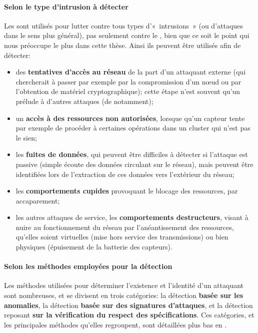         \paragraph{Selon le type d'intrusion à détecter}
Les \IDS sont utilisés pour lutter contre tous types d'« intrusions » (ou d'attaques dans le sens plus général), pas seulement contre le \dds, bien que ce soit le point qui nous préoccupe le plus dans cette thèse.
Ainsi ils peuvent être utilisés afin de détecter:
\begin{itemize}
    \item des \textbf{tentatives d'accès au réseau} de la part d'un attaquant externe (qui chercherait à passer par exemple par la compromission d'un nœud ou par l'obtention de matériel cryptographique); cette étape n'est souvent qu'un prélude à d'autres attaques (de \dds notamment);
    \item un \textbf{accès à des ressources non autorisées}, lorsque qu'un capteur tente par exemple de procéder à certaines opérations dans un cluster qui n'est pas le sien;
    \item les \textbf{fuites de données}, qui peuvent être difficiles à détecter si l'attaque est passive (simple écoute des données circulant sur le réseau), mais peuvent être identifiées lors de l'extraction de ces données vers l'extérieur du réseau;
    \item les \textbf{comportements cupides} provoquant le blocage des ressources, par accaparement;
    \item les autres attaques de service, \cad les \textbf{comportements destructeurs}, visant à nuire au fonctionnement du réseau par l'anéantissement des ressources, qu'elles soient virtuelles (mise hors service des transmissions) ou bien physiques (épuisement de la batterie des capteurs).
\end{itemize}

        \paragraph{Selon les méthodes employées pour la détection}
Les méthodes utilisées pour déterminer l'existence et l'identité d'un attaquant sont nombreuses, et se divisent en trois catégories: la détection \textbf{basée sur les anomalies}, la détection \textbf{basée sur des signatures d'attaques}, et la détection reposant \textbf{sur la vérification du respect des spécifications}.
Ces catégories, et les principales méthodes qu'elles regroupent, sont détaillées plus bas en .

